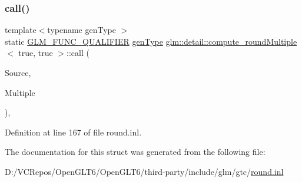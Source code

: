 \subsubsection{\texorpdfstring{call()}{call()}}
{\footnotesize\ttfamily template$<$typename gen\+Type $>$ \\
static \mbox{\hyperlink{setup_8hpp_a33fdea6f91c5f834105f7415e2a64407}{G\+L\+M\+\_\+\+F\+U\+N\+C\+\_\+\+Q\+U\+A\+L\+I\+F\+I\+ER}} \mbox{\hyperlink{structglm_1_1detail_1_1gen_type}{gen\+Type}} \mbox{\hyperlink{structglm_1_1detail_1_1compute__round_multiple}{glm\+::detail\+::compute\+\_\+round\+Multiple}}$<$ true, true $>$\+::call (\begin{DoxyParamCaption}\item[{\mbox{\hyperlink{structglm_1_1detail_1_1gen_type}{gen\+Type}}}]{Source,  }\item[{\mbox{\hyperlink{structglm_1_1detail_1_1gen_type}{gen\+Type}}}]{Multiple }\end{DoxyParamCaption})\hspace{0.3cm}{\ttfamily [inline]}, {\ttfamily [static]}}



Definition at line 167 of file round.\+inl.



The documentation for this struct was generated from the following file\+:\begin{DoxyCompactItemize}
\item 
D\+:/\+V\+C\+Repos/\+Open\+G\+L\+T6/\+Open\+G\+L\+T6/third-\/party/include/glm/gtc/\mbox{\hyperlink{round_8inl}{round.\+inl}}\end{DoxyCompactItemize}
